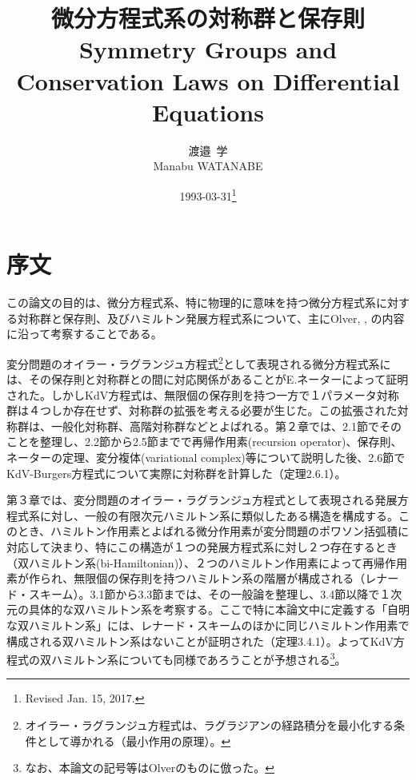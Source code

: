 \documentclass[a4paper, 11pt]{report}
\title{微分方程式系の対称群と保存則\\
Symmetry Groups and Conservation Laws on Differential Equations}
\author{渡邉\ 学\\
Manabu WATANABE}
\date{1993-03-31\thanks{Revised Jan. 15, 2017.}}
\theoremstyle{definition}
\begin{document}
\sffamily

\maketitle

\tableofcontents
\newpage

\chapter{序文}

 この論文の目的は、微分方程式系、特に物理的に意味を持つ微分方程式系に対する対称群と保存則、及びハミルトン発展方程式系について、主にOlver\cite{Olver2}, \cite{Olver4}, \cite{Olver5}の内容に沿って考察することである。

 変分問題のオイラー・ラグランジュ方程式\footnote{オイラー・ラグランジュ方程式は、ラグラジアンの経路積分を最小化する条件として導かれる（最小作用の原理）。}として表現される微分方程式系には、その保存則と対称群との間に対応関係があることがE.ネーターによって証明された。しかしKdV方程式は、無限個の保存則を持つ一方で１パラメータ対称群は４つしか存在せず、対称群の拡張を考える必要が生じた。この拡張された対称群は、一般化対称群、高階対称群などとよばれる。第２章では、2.1節でそのことを整理し、2.2節から2.5節までで再帰作用素(recursion operator)、保存則、ネーターの定理、変分複体(variational complex)等について説明した後、2.6節でKdV-Burgers方程式について実際に対称群を計算した（定理2.6.1）。

 第３章では、変分問題のオイラー・ラグランジュ方程式として表現される発展方程式系に対し、一般の有限次元ハミルトン系に類似したある構造を構成する。このとき、ハミルトン作用素とよばれる微分作用素が変分問題のポワソン括弧積に対応して決まり、特にこの構造が１つの発展方程式系に対し２つ存在するとき（双ハミルトン系(bi-Hamiltonian)）、２つのハミルトン作用素によって再帰作用素が作られ、無限個の保存則を持つハミルトン系の階層が構成される（レナード・スキーム）。3.1節から3.3節までは、その一般論を整理し、3.4節以降で１次元の具体的な双ハミルトン系を考察する。ここで特に本論文中に定義する「自明な双ハミルトン系」には、レナード・スキームのほかに同じハミルトン作用素で構成される双ハミルトン系はないことが証明された（定理3.4.1）。よってKdV方程式の双ハミルトン系についても同様であろうことが予想される\footnote{なお、本論文の記号等はOlver\cite{Olver4}のものに倣った。}。\\
\end{document}
